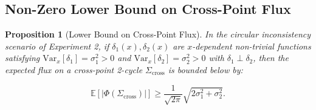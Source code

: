 \documentclass[12pt,a4paper]{article}
\theoremstyle{plain}
\newtheorem{proposition}[theorem]{Proposition}
\theoremstyle{definition}
\theoremstyle{remark}
\newcommand{\E}{\mathbb{E}}
\newcommand{\Var}{\mathrm{Var}}
\begin{document}
\subsection{Non-Zero Lower Bound on Cross-Point Flux}
\label{sec:flux_lowerbound}

\begin{proposition}[Lower Bound on Cross-Point Flux]
\label{prop:flux_lowerbound}
In the circular inconsistency scenario of Experiment 2, if $\delta_1(x), \delta_2(x)$ are $x$-dependent non-trivial functions satisfying $\Var_x[\delta_1] = \sigma_1^2 > 0$ and $\Var_x[\delta_2] = \sigma_2^2 > 0$ with $\delta_1 \perp \delta_2$, then the expected flux on a cross-point 2-cycle $\Sigma_{\mathrm{cross}}$ is bounded below by:

\begin{equation}\label{eq:flux_lower}
    \E[|\Phi(\Sigma_{\mathrm{cross}})|] \geq \frac{1}{\sqrt{2\pi}} \sqrt{2\sigma_1^2 + \sigma_2^2}.
\end{equation}
\end{proposition}
\end{document}
